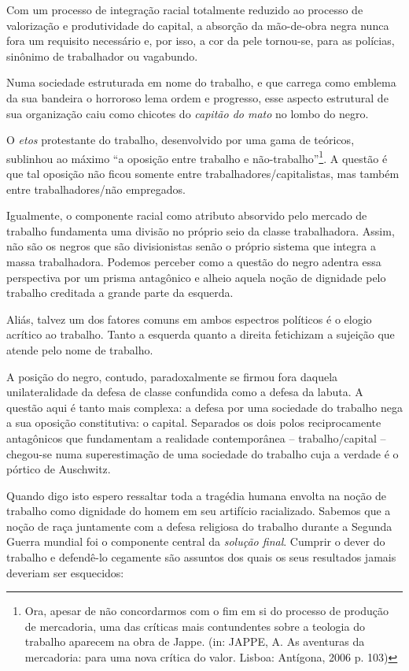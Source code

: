 Com um processo de integração racial totalmente reduzido ao processo de
valorização e produtividade do capital, a absorção da mão-de-obra negra
nunca fora um requisito necessário e, por isso, a cor da pele tornou-se,
para as polícias, sinônimo de trabalhador ou vagabundo.

Numa sociedade estruturada em nome do trabalho, e que carrega como
emblema da sua bandeira o horroroso lema ordem e progresso, esse aspecto
estrutural de sua organização caiu como chicotes do \emph{capitão do
mato} no lombo do negro.

O \emph{etos} protestante do trabalho, desenvolvido por uma gama de
teóricos, sublinhou ao máximo ``a oposição entre trabalho e
não-trabalho''\footnote{Ora, apesar de não concordarmos com o fim em si
  do processo de produção de mercadoria, uma das críticas mais
  contundentes sobre a teologia do trabalho aparecem na obra de Jappe.
  (in: JAPPE, A. As aventuras da mercadoria: para uma nova crítica do
  valor. Lisboa: Antígona, 2006 p. 103)}. A questão é que tal oposição
não ficou somente entre trabalhadores/capitalistas, mas também entre
trabalhadores/não empregados.

Igualmente, o componente racial como atributo absorvido pelo mercado de
trabalho fundamenta uma divisão no próprio seio da classe trabalhadora.
Assim, não são os negros que são divisionistas senão o próprio sistema
que integra a massa trabalhadora. Podemos perceber como a questão do
negro adentra essa perspectiva por um prisma antagônico e alheio aquela
noção de dignidade pelo trabalho creditada a grande parte da esquerda.

Aliás, talvez um dos fatores comuns em ambos espectros políticos é o
elogio acrítico ao trabalho. Tanto a esquerda quanto a direita
fetichizam a sujeição que atende pelo nome de trabalho.

A posição do negro, contudo, paradoxalmente se firmou fora daquela
unilateralidade da defesa de classe confundida como a defesa da labuta.
A questão aqui é tanto mais complexa: a defesa por uma sociedade do
trabalho nega a sua oposição constitutiva: o capital. Separados os dois
polos reciprocamente antagônicos que fundamentam a realidade
contemporânea -- trabalho/capital -- chegou-se numa superestimação de
uma sociedade do trabalho cuja a verdade é o pórtico de Auschwitz.

Quando digo isto espero ressaltar toda a tragédia humana envolta na
noção de trabalho como dignidade do homem em seu artifício racializado.
Sabemos que a noção de raça juntamente com a defesa religiosa do
trabalho durante a Segunda Guerra mundial foi o componente central da
\emph{solução final}. Cumprir o dever do trabalho e defendê-lo cegamente
são assuntos dos quais os seus resultados jamais deveriam ser
esquecidos:


